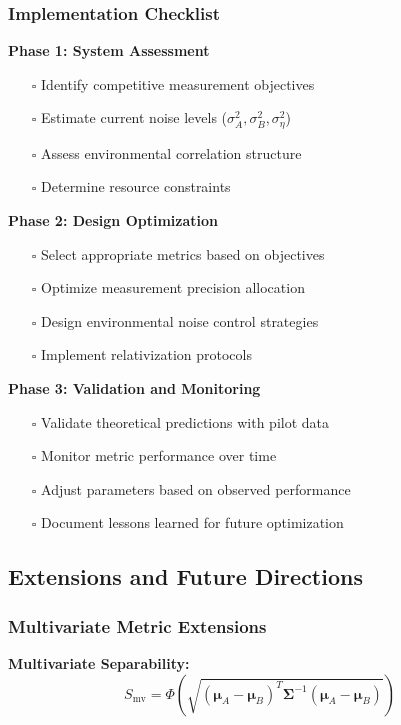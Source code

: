 \subsubsection{Implementation Checklist}

\textbf{Phase 1: System Assessment}
\begin{itemize}
\item[$\square$] Identify competitive measurement objectives
\item[$\square$] Estimate current noise levels ($\sigma_A^2, \sigma_B^2, \sigma_\eta^2$)
\item[$\square$] Assess environmental correlation structure
\item[$\square$] Determine resource constraints
\end{itemize}

\textbf{Phase 2: Design Optimization}
\begin{itemize}
\item[$\square$] Select appropriate metrics based on objectives
\item[$\square$] Optimize measurement precision allocation
\item[$\square$] Design environmental noise control strategies
\item[$\square$] Implement relativization protocols
\end{itemize}

\textbf{Phase 3: Validation and Monitoring}
\begin{itemize}
\item[$\square$] Validate theoretical predictions with pilot data
\item[$\square$] Monitor metric performance over time
\item[$\square$] Adjust parameters based on observed performance
\item[$\square$] Document lessons learned for future optimization
\end{itemize}

\subsection{Extensions and Future Directions}

\subsubsection{Multivariate Metric Extensions}

\textbf{Multivariate Separability:}
\begin{equation}
S_{\text{mv}} = \Phi\left(\sqrt{(\boldsymbol{\mu}_A - \boldsymbol{\mu}_B)^T \boldsymbol{\Sigma}^{-1} (\boldsymbol{\mu}_A - \boldsymbol{\mu}_B)}\right)
\end{equation}

